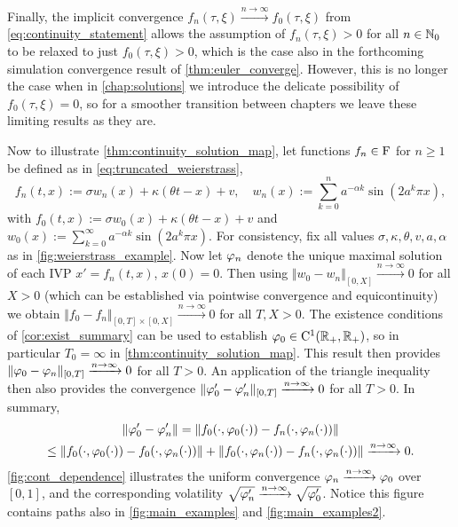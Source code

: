 Finally, the implicit convergence $f_n(\tau,\xi) \xrightarrow{n\to\infty}f_0(\tau,\xi)$ from \autoref{eq:continuity_statement} allows the assumption of $f_n(\tau,\xi)>0$ for all $n\in\mathbb{N}_0$ to be relaxed to just $f_0(\tau,\xi)>0$, which is the case also in the forthcoming simulation convergence result of \autoref{thm:euler_converge}. However, this is no longer the case when in \autoref{chap:solutions} we introduce the delicate possibility of $f_0(\tau,\xi)=0$, so for a smoother transition between chapters we leave these limiting results as they are.

\vspace{4mm}Now to illustrate \autoref{thm:continuity_solution_map}, let functions $f_n\in\mathrm{F}$ for $n\ge1$ be defined as in \autoref{eq:truncated_weierstrass},~
\begin{equation}\label{eq:cont_ex}
    f_n(t,x) := \sigma w_n(x) + \kappa(\theta t - x) + v,\quad w_n(x):=\sum_{k=0}^n a^{-\alpha k}\sin(2a^k\pi x),
\end{equation}
with $f_0(t,x) := \sigma w_0(x) + \kappa(\theta t - x) + v$ and $w_0(x):=\sum_{k=0}^\infty a^{-\alpha k}\sin(2a^k\pi x)$. For consistency, fix all values $\sigma,\kappa,\theta,v,a,\alpha$ as in \autoref{fig:weierstrass_example}. Now let $\varphi_n$ denote the unique maximal solution of each IVP $x'=f_n(t,x)$, $x(0)=0$. Then using $\Vert w_0-w_n\Vert_{[0,X]}\xrightarrow{n\to\infty}0$ for all $X>0$ (which can be established via pointwise convergence and equicontinuity) we obtain $\Vert f_0-f_n\Vert_{[0,T]\times[0,X]}\xrightarrow{n\to\infty}0$ for all $T,X>0$. The existence conditions of \autoref{cor:exist_summary} can be used to establish $\varphi_0\in\mathrm{C}^1(\mathbb{R}_+,\mathbb{R}_+)$, so in particular $T_0=\infty$ in \autoref{thm:continuity_solution_map}. This result then provides $\Vert \varphi_0-\varphi_n\Vert_{[0,T]}\xrightarrow{n\to\infty}0$ for all $T>0$. An application of the triangle inequality then also provides the convergence $\Vert \varphi'_0-\varphi'_n\Vert_{[0,T]}\xrightarrow{n\to\infty}0$ for all $T>0$. In summary,
\begin{multline}
    \Vert \varphi'_0-\varphi'_n\Vert = \Vert f_0(\cdot,\varphi_0(\cdot)) - f_n(\cdot,\varphi_n(\cdot))\Vert\\
    \le \Vert f_0(\cdot,\varphi_0(\cdot)) - f_0(\cdot,\varphi_n(\cdot))\Vert + \Vert f_0(\cdot,\varphi_n(\cdot)) - f_n(\cdot,\varphi_n(\cdot))\Vert \xrightarrow{n\to\infty}0.
\end{multline}
\autoref{fig:cont_dependence} illustrates the uniform convergence $\varphi_n\xrightarrow{n\to\infty}\varphi_0$ over $[0,1]$, and the corresponding volatility $\sqrt{\varphi'_n}\xrightarrow{n\to\infty}\sqrt{\varphi'_0}$. Notice this figure contains paths also in \autoref{fig:main_examples} and \autoref{fig:main_examples2}.

